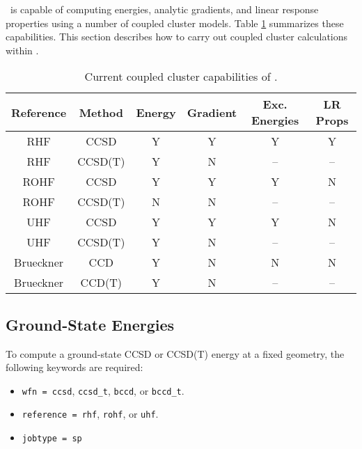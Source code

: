 \PSIthree\ is capable of computing energies, analytic gradients, and
linear response properties using a number of coupled cluster models.
Table \ref{table:ccsummary} summarizes these capabilities.  This
section describes how to carry out coupled cluster calculations within
\PSIthree.
\begin{table}
\begin{center}
\begin{tabular}{cccccc}
\hline
\hline
Reference & Method & Energy    & Gradient  &  Exc. Energies & LR Props \\
\hline
RHF       & CCSD    & Y & Y & Y & Y  \\
RHF       & CCSD(T) & Y & N & --& -- \\
ROHF      & CCSD    & Y & Y & Y & N  \\
ROHF      & CCSD(T) & N & N & --& -- \\
UHF       & CCSD    & Y & Y & Y & N  \\
UHF       & CCSD(T) & Y & N & --& -- \\
Brueckner & CCD     & Y & N & N & N  \\
Brueckner & CCD(T)  & Y & N & --& -- \\
\hline
\hline
\end{tabular}
\end{center}
\caption{Current coupled cluster capabilities of \PSIthree.}
\label{table:ccsummary}
\end{table}

\subsection{Ground-State Energies}

To compute a ground-state CCSD or CCSD(T) energy at a fixed geometry,
the following keywords are required:
\begin{itemize}
\item {\tt wfn = ccsd}, {\tt ccsd_t}, {\tt bccd}, or {\tt bccd_t}.
\item {\tt reference = rhf}, {\tt rohf}, or {\tt uhf}.
\item {\tt jobtype = sp}
\end{itemize}

